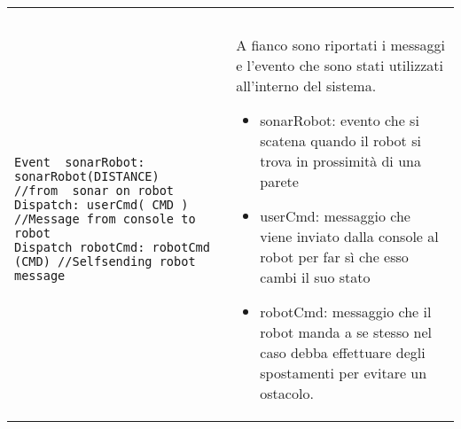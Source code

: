     
\begin{tabular}{|@{}p{10cm}|p{5cm}|}
\hline\\
  &   \\
\begin{lstlisting}[backgroundcolor=\color{white}]
Event  sonarRobot: sonarRobot(DISTANCE)	    //from  sonar on robot      
Dispatch: userCmd( CMD ) //Message from console to robot
Dispatch robotCmd: robotCmd (CMD) //Selfsending robot message
\end{lstlisting} &  \vspace{0.5ex} A fianco sono riportati i messaggi e l'evento  che sono stati utilizzati all'interno del sistema. 
\begin{itemize}
\item sonarRobot: evento che si scatena quando il robot si trova in prossimità di una parete 
\item userCmd: messaggio che viene inviato dalla console al robot per far sì che esso cambi il suo stato 
\item robotCmd: messaggio che il robot manda a se stesso nel caso debba effettuare degli spostamenti per evitare un ostacolo.
\end{itemize}{}\\
\hline 
\end{tabular}

